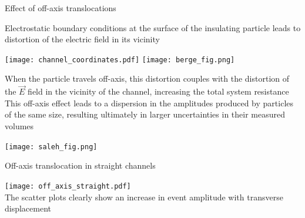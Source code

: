 \begin{frame}[c]{Effect of off-axis translocations}
	
	{\scriptsize
		Electrostatic boundary conditions at the surface of the insulating particle leads to distortion of the electric field in its vicinity \\
		\vspace{.1in}
		{\centering
			\texttt{[image: channel\_coordinates.pdf]}
			\hspace{.4in}
			\texttt{[image: berge\_fig.png]} \\ 
			\par
		}
		
		\vspace{.1in}
		When the particle travels off-axis, this distortion couples with the distortion of the $\vec{E}$ field in the vicinity of the channel, increasing the total system resistance \\
		\vspace{.1in}
		This off-axis effect leads to a dispersion in the amplitudes produced by particles of the same size, resulting ultimately in larger uncertainties in their measured volumes \\
		\vspace{.1in}
		{\centering
			\texttt{[image: saleh\_fig.png]} \\
			\par
		}
		
	}
	
\end{frame}





\begin{frame}[c]{Off-axis translocation in straight channels}
	
	{\centering
		\texttt{[image: off\_axis\_straight.pdf]} \\
		{\scriptsize \textcolor{negativered}{The scatter plots clearly show an increase in event amplitude with transverse displacement } } \\
		\par
	}
	
\end{frame}



